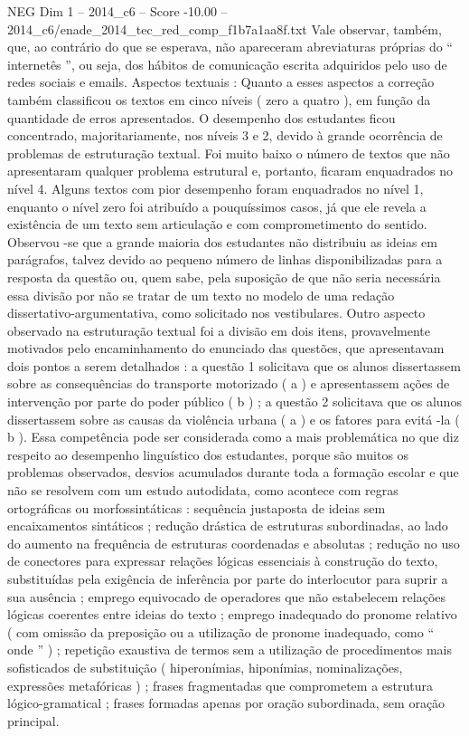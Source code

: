 \begin{textsample}{NEG Dim 1 – 2014\_c6 – Score -10.00 – 2014\_c6/enade\_2014\_tec\_red\_comp\_f1b7a1aa8f.txt}
Vale observar, também, que, ao contrário do que se esperava, não apareceram abreviaturas próprias do “ internetês ”, ou seja, dos hábitos de comunicação escrita adquiridos pelo uso de redes sociais e emails.
Aspectos textuais : Quanto a esses aspectos a correção também classificou os textos em cinco níveis ( zero a quatro ), em função da quantidade de erros apresentados.
O desempenho dos estudantes ficou concentrado, majoritariamente, nos níveis 3 e 2, devido à grande ocorrência de problemas de estruturação textual.
Foi muito baixo o número de textos que não apresentaram qualquer problema estrutural e, portanto, ficaram enquadrados no nível 4.
Alguns textos com pior desempenho foram enquadrados no nível 1, enquanto o nível zero foi atribuído a pouquíssimos casos, já que ele revela a existência de um texto sem articulação e com comprometimento do sentido.
Observou -se que a grande maioria dos estudantes não distribuiu as ideias em parágrafos, talvez devido ao pequeno número de linhas disponibilizadas para a resposta da questão ou, quem sabe, pela suposição de que não seria necessária essa divisão por não se tratar de um texto no modelo de uma redação dissertativo-argumentativa, como solicitado nos vestibulares.
Outro aspecto observado na estruturação textual foi a divisão em dois itens, provavelmente motivados pelo encaminhamento do enunciado das questões, que apresentavam dois pontos a serem detalhados : a questão 1 solicitava que os alunos dissertassem sobre as consequências do transporte motorizado ( a ) e apresentassem ações de intervenção por parte do poder público ( b ) ; a questão 2 solicitava que os alunos dissertassem sobre as causas da violência urbana ( a ) e os fatores para evitá -la ( b ).
Essa competência pode ser considerada como a mais problemática no que diz respeito ao desempenho linguístico dos estudantes, porque são muitos os problemas observados, desvios acumulados durante toda a formação escolar e que não se resolvem com um estudo autodidata, como acontece com regras ortográficas ou morfossintáticas : sequência justaposta de ideias sem encaixamentos sintáticos ; redução drástica de estruturas subordinadas, ao lado do aumento na frequência de estruturas coordenadas e absolutas ; redução no uso de conectores para expressar relações lógicas essenciais à construção do texto, substituídas pela exigência de inferência por parte do interlocutor para suprir a sua ausência ; emprego equivocado de operadores que não estabelecem relações lógicas coerentes entre ideias do texto ; emprego inadequado do pronome relativo ( com omissão da preposição ou a utilização de pronome inadequado, como “ onde ” ) ; repetição exaustiva de termos sem a utilização de procedimentos mais sofisticados de substituição ( hiperonímias, hiponímias, nominalizações, expressões metafóricas ) ; frases fragmentadas que comprometem a estrutura lógico-gramatical ; frases formadas apenas por oração subordinada, sem oração principal.

\end{textsample}
